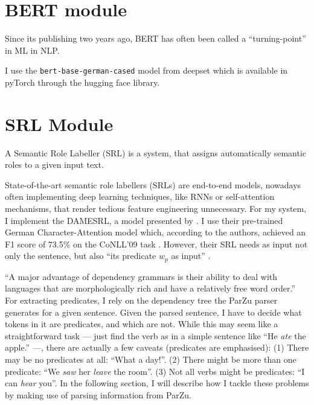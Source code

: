 \section{BERT module}

Since its publishing two years ago, BERT \citep{devlin2018bert} has often been called a ``turning-point'' in ML in NLP.

I use the \texttt{bert-base-german-cased} model from deepset which is available in pyTorch through the hugging face library\cite{wolf2019transformers}.

\section{SRL Module}

A Semantic Role Labeller (SRL) is a system, that assigns automatically semantic roles to a given input text.

State-of-the-art semantic role labellers (SRLs) are end-to-end models, nowadays often implementing deep learning techniques, like RNNs or self-attention mechanisms, that render tedious feature engineering unnecessary.
For my system, I implement the DAMESRL, a model presented by \cite{do2018flexible}.
I use their pre-trained German Character-Attention model which, according to the authors, achieved an F1 score of 73.5\% on the CoNLL'09 task \citep{hajivc2009conll}.
However, their SRL needs as input not only the sentence, but also ``its predicate $w_p$ as input'' \citep{do2018flexible}.

``A major advantage of dependency grammars is their ability to deal with languages that are morphologically rich and have a relatively free word order.'' \citep[p.~274]{jurafsky2019speech}
For extracting predicates, I rely on the dependency tree the ParZu parser \cite{sennrich2013exploiting} generates for a given sentence.
Given the parsed sentence, I have to decide what tokens in it are predicates, and which are not.
While this may seem like a straightforward task --- just find the verb as in a simple sentence like ``He \emph{ate} the apple.'' ---, there are actually a few caveats (predicates are emphasised):
(1) There may be no predicates at all: ``What a day!''. (2) There might be more than one predicate: ``We \emph{saw} her \emph{leave} the room''. (3) Not all verbs might be predicates: ``I can \emph{hear} you''.
In the following section, I will describe how I tackle these problems by making use of parsing information from ParZu.

